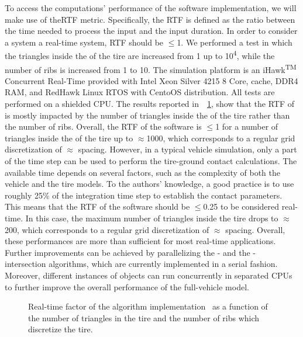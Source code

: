 To access the computations' performance of the \Enve{} \cpp{} software implementation, we will make use of the\ac{RTF} metric. Specifically, the \ac{RTF} is defined as the ratio between the time needed to process the input and the input duration. In order to consider a system a real-time system, \ac{RTF} should be $\leq$1. We performed a test in which the triangles inside the \Aabb{} of the tire are increased from 1 up to 10\textsuperscript{4}, while the number of ribs is increased from 1 to 10. The simulation platform is an iHawk\textsuperscript{TM} Concurrent Real-Time provided with  Intel Xeon Silver 4215 8 Core,  cache,  DDR4 RAM, and  RedHawk Linux RTOS with CentoOS distribution. All tests are performed on a shielded CPU. The results reported in~\figurename{}~\ref{chap3:fig:rtf_enve}, show that the \ac{RTF} of \Enve{} is mostly impacted by the number of triangles inside the \Aabb{} of the tire rather than the number of ribs. Overall, the \ac{RTF} of the software is $\leq$1 for a number of triangles inside the \Aabb{} of the tire up to $\approx$1000, which corresponds to a regular grid discretization of $\approx$ spacing. However, in a typical vehicle simulation, only a part of the time step can be used to perform the tire-ground contact calculations. The available time depends on several factors, such as the complexity of both the vehicle and the tire models. To the authors' knowledge, a good practice is to use roughly 25\% of the integration time step to establish the contact parameters. This means that the \ac{RTF} of the software should be $\leq$0.25 to be considered real-time. In this case, the maximum number of triangles inside the tire \Aabb{} drops to $\approx$200, which corresponds to a regular grid discretization of $\approx$ spacing. Overall, these performances are more than sufficient for most real-time applications. Further improvements can be achieved by parallelizing the \AabbTree{}-\Aabb{} and the \Rib{}-\TriangleGround{} intersection algorithms, which are currently implemented in a serial fashion. Moreover, different instances of \Enve{} objects can run concurrently in separated CPUs to further improve the overall performance of the full-vehicle model.

\begin{figure}[!htp]
  \centering
  \caption{Real-time factor of the \Enve{} algorithm \cpp{} implementation~\cite{enve} as a function of the number of triangles in the tire \Aabb{} and the number of ribs which discretize the tire.}
  \label{chap3:fig:rtf_enve}
\end{figure}

